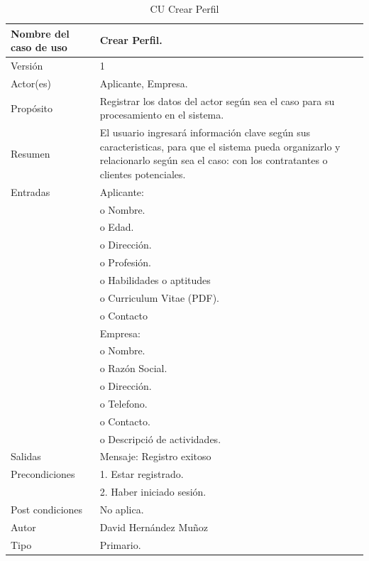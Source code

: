 \begin{table}[h]			
        \begin{center}			
\begin{tabular}{|l|p{11cm}|} \hline			
Nombre del caso de uso	&	Crear Perfil.	\\ \hline
Versión	&	1	\\ \hline
Actor(es)	&	Aplicante, Empresa.	\\ \hline
Propósito	&	Registrar los datos del actor según sea el caso para su procesamiento en el sistema.	\\ \hline
Resumen	&	El usuario ingresará información clave según sus caracteristicas, para que el sistema pueda organizarlo y relacionarlo según sea el caso: con los contratantes o clientes potenciales. 	\\ \hline
Entradas	&	Aplicante:\\
&o Nombre.\\
&o Edad.\\
&o Dirección.\\
&o Profesión.\\
&o Habilidades o aptitudes\\
&o Curriculum Vitae (PDF).\\
&o Contacto\\
& Empresa:\\
&o Nombre.\\
&o Razón Social.\\
&o Dirección.\\
&o Telefono.\\
&o Contacto. \\
&o Descripció de actividades.	\\		\hline
Salidas	&	Mensaje: Registro exitoso	\\ \hline
Precondiciones	&	1. Estar registrado.\\
& 2. Haber iniciado sesión.
	\\ \hline
Post condiciones	&	No aplica.	\\ \hline
Autor	&	David Hernández Muñoz	\\ \hline
Tipo	&	Primario.	\\ \hline
\end{tabular}			
        \caption	{	CU Crear Perfil	}
        \label	{tabla	2	}
        \end{center}			
\end{table}			

